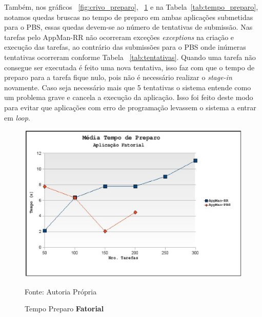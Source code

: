 Também, nos gráficos ~\ref{fig:crivo_preparo}, ~\ref{fig:fatorial_preparo} e na Tabela~\ref{tab:tempo_preparo}, notamos quedas bruscas no tempo de preparo em ambas aplicações submetidas para o PBS, essas quedas devem-se ao número de tentativas de submissão. Nas tarefas pelo AppMan-RR não ocorreram exceções \emph{exceptions} na criação e execução das tarefas, ao contrário das submissões para o PBS onde inúmeras tentativas ocorreram conforme Tabela ~\ref{tab:tentativas}. Quando uma tarefa não consegue ser executada é feito uma nova tentativa, isso faz com que o tempo de preparo para a tarefa fique nulo, pois não é necessário realizar o \emph{stage-in} novamente. Caso seja necessário mais que 5 tentativas o sistema entende como um problema grave e cancela a execução da aplicação. Isso foi feito deste modo para evitar que aplicações com erro de programação levassem o sistema a entrar em \emph{loop}.

\begin{figure}[hbtp]
\begin{center}
\includegraphics[scale=0.7]{./img/PreparoFatorial.ps}
\caption{Tempo Preparo \textbf{Fatorial}}
\label{fig:fatorial_preparo}
Fonte: Autoria Própria
\end{center}
\end{figure}

